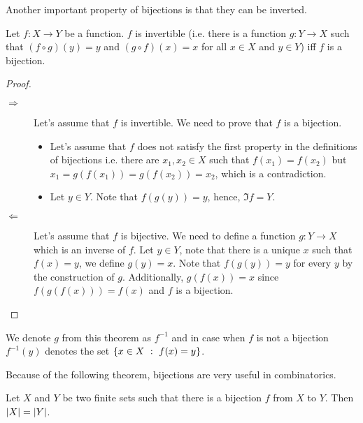 Another important property of bijections is that they can be inverted.
\begin{theorem}
\label{theorem:inverse-of-bijections}
    Let $f : X \to Y$ be a function. $f$ is invertible (i.e. there is a function
    $g : Y \to X$ such that $(f \circ g)(y) = y$ and $(g \circ f)(x) = x$ for all
    $x \in X$ and $y \in Y$) iff $f$ is a bijection.
\end{theorem}
\begin{proof}
    \begin{description}
        \item[$\Rightarrow$] Let's assume that $f$ is invertible. We need to prove
            that $f$ is a bijection.
            \begin{itemize}
                \item Let's assume that $f$ does not satisfy the first property in the
                    definitions of bijections i.e. there are
                    $x_1, x_2 \in X$ such that $f(x_1) = f(x_2)$ but
                    $x_1 = g(f(x_1)) = g(f(x_2)) = x_2$, which is a
                    contradiction.
                \item Let $y \in Y$. Note that $f(g(y)) = y$, hence,
                    $\Im f = Y$.
            \end{itemize}

        \item[$\Leftarrow$] Let's assume that $f$ is bijective. We need to define a
            function $g : Y \to X$ which is an inverse of $f$. Let $y \in Y$, note
            that there is a unique $x$ such that $f(x) = y$, we define $g(y) = x$.
            Note that $f(g(y)) = y$ for every $y$ by the construction of $g$.
            Additionally, $g(f(x)) = x$ since $f(g(f(x))) = f(x)$ and $f$ is a
            bijection.
    \end{description}
\end{proof}
\noindent We denote $g$ from this theorem as $f^{-1}$ and in case when $f$ is
not a bijection $f^{-1}(y)$ denotes the set $\set[f(x) = y]{x \in X}$.

Because of the following theorem, bijections are very useful in combinatorics.
\begin{theorem}
\label{theorem:bijection-to-equality}
    Let $X$ and $Y$ be two finite sets such that there is a bijection $f$ from
    $X$ to $Y$. Then $\left|{X}\right| = \left|{Y}\right|$.
\end{theorem}

